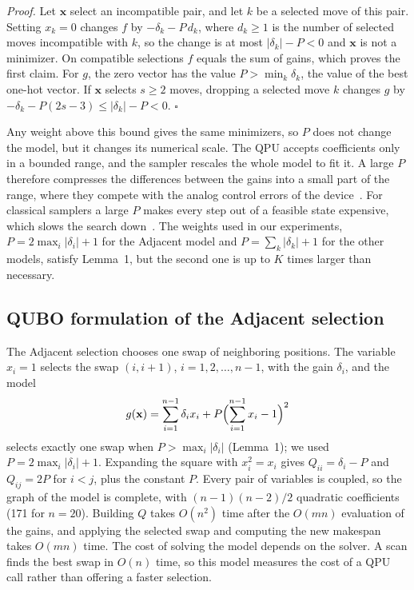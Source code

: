 \documentclass[10pt,twoside,twocolumn,a4paper]{article}
\newif\ifrevmarks \revmarksfalse
\newcommand{\rev}[1]{\ifrevmarks\textcolor{red}{#1}\else#1\fi}
\newenvironment{revblock}{\ifrevmarks\color{red}\fi}{}
\begin{document}
\begin{revblock}
\emph{Proof.} Let $\mathbf{x}$ select an incompatible pair, and let $k$ be a selected move of this pair. Setting $x_k=0$ changes $f$ by $-\delta_k-P\,d_k$, where $d_k\ge 1$ is the number of selected moves incompatible with $k$, so the change is at most $|\delta_k|-P<0$ and $\mathbf{x}$ is not a minimizer. On compatible selections $f$ equals the sum of gains, which proves the first claim. For $g$, the zero vector has the value $P>\min_k\delta_k$, the value of the best one-hot vector. If $\mathbf{x}$ selects $s\ge 2$ moves, dropping a selected move $k$ changes $g$ by $-\delta_k-P(2s-3)\le|\delta_k|-P<0$. \hfill$\square$

Any weight above this bound gives the same minimizers, so $P$ does not change the model, but it changes its numerical scale. The QPU accepts coefficients only in a bounded range, and the sampler rescales the whole model to fit it. A large $P$ therefore compresses the differences between the gains into a small part of the range, where they compete with the analog control errors of the device~\cite{dwave_handbook}. For classical samplers a large $P$ makes every step out of a feasible state expensive, which slows the search down~\cite{Glover2019}. The weights used in our experiments, $P=2\max_i|\delta_i|+1$ for the Adjacent model and $P=\sum_k|\delta_k|+1$ for the other models, satisfy Lemma~1, but the second one is up to $K$ times larger than necessary.
\end{revblock}

\subsection{\rev{QUBO formulation of the Adjacent selection}}
\begin{revblock}
The Adjacent selection chooses one swap of neighboring positions. The variable $x_i=1$ selects the swap $(i,i+1)$, $i=1,2,\dots,n-1$, with the gain $\delta_i$, and the model
\begin{equation}
g(\mathbf{x})=\sum_{i=1}^{n-1}\delta_ix_i+P\Bigl(\sum_{i=1}^{n-1}x_i-1\Bigr)^2
\end{equation}
selects exactly one swap when $P>\max_i|\delta_i|$ (Lemma~1); we used $P=2\max_i|\delta_i|+1$. Expanding the square with $x_i^2=x_i$ gives $Q_{ii}=\delta_i-P$ and $Q_{ij}=2P$ for $i<j$, plus the constant $P$. Every pair of variables is coupled, so the graph of the model is complete, with $(n-1)(n-2)/2$ quadratic coefficients (171 for $n=20$). Building $Q$ takes $O(n^2)$ time after the $O(mn)$ evaluation of the gains, and applying the selected swap and computing the new makespan takes $O(mn)$ time. The cost of solving the model depends on the solver. A scan finds the best swap in $O(n)$ time, so this model measures the cost of a QPU call rather than offering a faster selection.
\end{revblock}
\end{document}
